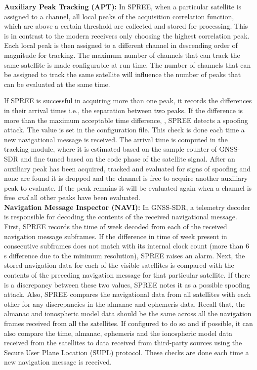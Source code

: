 \documentclass[letterpaper,twocolumn,10pt]{article}
\newcommand{\ie}{i.e.,\xspace}
\newcommand{\rxname}{SPREE\xspace}
\begin{document}
\noindent\textbf{Auxiliary Peak Tracking (APT):} In SPREE, when a particular satellite is assigned to a channel, all local peaks of the acquisition correlation function, which are above a certain threshold are collected and stored for processing. This is in contrast to the modern receivers only choosing the highest correlation peak. Each local peak is then assigned to a different channel in descending order of magnitude for tracking. The maximum number of channels that can track the same satellite is made configurable at run time. The number of channels that can be assigned to track the same satellite will influence the number of peaks that can be evaluated at the same time.

If \rxname is successful in acquiring more than one peak, it records the differences in their arrival times \ie the separation between two peaks.  If the difference is more than the maximum acceptable time difference, , \rxname detects a spoofing attack. The value    is set in the configuration file. This check is done each time a new navigational message is received. The arrival time is computed in the tracking module, where it is estimated based on the sample counter of GNSS-SDR and fine tuned based on the code phase of the satellite signal. After an auxiliary peak has been acquired, tracked and evaluated for signs of spoofing and none are found it is dropped and the channel is free to acquire another auxiliary peak to evaluate. If the peak remains it will be evaluated again when a channel is free \textit{and} all other peaks have been evaluated.\\





\noindent\textbf{Navigation Message Inspector (NAVI):} In GNSS-SDR, a telemetry decoder is responsible for decoding the contents of the received navigational message. First, \rxname records the time of week decoded from each of the received navigation message subframes. If the  difference in time of week present in consecutive subframes does not match with its internal clock count (more than 6 s difference due to the minimum resolution), \rxname raises an alarm. Next, the stored navigation data for each of the visible satellites is compared with the contents of the preceding navigation message for that particular satellite. If there is a discrepancy between these two values, \rxname notes it as a possible spoofing attack. Also, \rxname compares the navigational data from all satellites with each other for any discrepancies in the almanac and ephemeris data. Recall that, the almanac and ionospheric model data should be the same across all the navigation frames received from all the satellites. If configured to do so and if possible, it can also compare the time, almanac, ephemeris and the ionospheric model data received from the satellites to data received from third-party sources using the Secure User Plane Location (SUPL) protocol. These checks are done each time a new navigation message is received.\\
\end{document}
